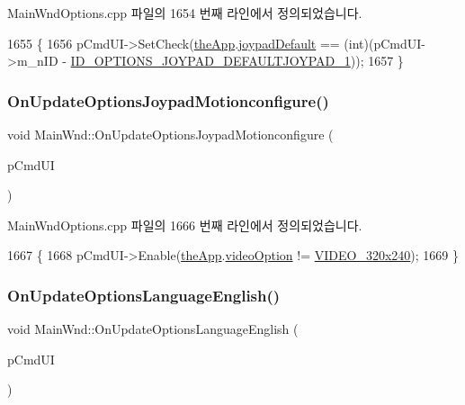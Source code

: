 Main\+Wnd\+Options.\+cpp 파일의 1654 번째 라인에서 정의되었습니다.


\begin{DoxyCode}
1655 \{
1656   pCmdUI->SetCheck(\mbox{\hyperlink{_v_b_a_8cpp_a8095a9d06b37a7efe3723f3218ad8fb3}{theApp}}.\mbox{\hyperlink{class_v_b_a_af42f79cc8ea9f0f95bf4634c0b9224dd}{joypadDefault}} == (\textcolor{keywordtype}{int})(pCmdUI->m\_nID - 
      \mbox{\hyperlink{resource_8h_ac515afc57e2ba0f825f5418020414d97}{ID\_OPTIONS\_JOYPAD\_DEFAULTJOYPAD\_1}}));
1657 \}
\end{DoxyCode}
\mbox{\label{class_main_wnd_a3fd5aad599ccaff89fc20fb38a7c93d6}} 
\subsubsection{\texorpdfstring{On\+Update\+Options\+Joypad\+Motionconfigure()}{OnUpdateOptionsJoypadMotionconfigure()}}
{\footnotesize\ttfamily void Main\+Wnd\+::\+On\+Update\+Options\+Joypad\+Motionconfigure (\begin{DoxyParamCaption}\item[{C\+Cmd\+UI $\ast$}]{p\+Cmd\+UI }\end{DoxyParamCaption})\hspace{0.3cm}{\ttfamily [protected]}}



Main\+Wnd\+Options.\+cpp 파일의 1666 번째 라인에서 정의되었습니다.


\begin{DoxyCode}
1667 \{
1668   pCmdUI->Enable(\mbox{\hyperlink{_v_b_a_8cpp_a8095a9d06b37a7efe3723f3218ad8fb3}{theApp}}.\mbox{\hyperlink{class_v_b_a_a17dac073149c897f770c00ed7098ad32}{videoOption}} != \mbox{\hyperlink{_v_b_a_8h_a531c35e38ede3ea4e5ba5afb24b29493a658665cfbdbd908bdb77babe125d0341}{VIDEO\_320x240}});
1669 \}
\end{DoxyCode}
\mbox{\label{class_main_wnd_a4c2148b6e984eadb4bc8e16f43d720dc}} 
\subsubsection{\texorpdfstring{On\+Update\+Options\+Language\+English()}{OnUpdateOptionsLanguageEnglish()}}
{\footnotesize\ttfamily void Main\+Wnd\+::\+On\+Update\+Options\+Language\+English (\begin{DoxyParamCaption}\item[{C\+Cmd\+UI $\ast$}]{p\+Cmd\+UI }\end{DoxyParamCaption})\hspace{0.3cm}{\ttfamily [protected]}}



